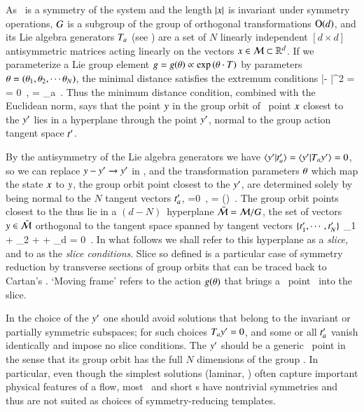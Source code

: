 As \Group\ is a symmetry of the system and the length $|x|$ is
invariant under symmetry operations, $G$ is a subgroup of the group
of orthogonal transformations $\textrm{O}(d)$, and its Lie algebra {generators}
$T_a$ (see ) are a set of $N$ linearly independent
$[d\!\times\!d]$ antisymmetric matrices acting linearly on the {\statesp}
vectors $x \in {\cal M} \subset \mathbb{R}^d$. If we parameterize a Lie group
element $g=g({\bf \theta})\propto\exp{({\ensuremath{{\bf \theta}}} \cdot \ensuremath{T})}$ by
parameters ${\bf \theta} = ({\bf \theta}_1,{\bf \theta}_2,\cdots{\bf \theta}_N)$, the minimal
distance satisfies the extremum conditions
\beq
{} |\ssp - \LieEl\slicep|^2
   =
   = 0
    \,,\qquad
	   = \Lg_a \slicep
\,.
\label{PCsectQ}
\eeq
Thus the minimum distance condition, combined with the Euclidean norm, says
that the point $y$ in the group orbit of \statesp\ point $x$
closest to the {\template} ${y'}$ lies in a hyperplane
through the point ${y'}$, normal to the group action tangent space
$t'_{}$.

By the antisymmetry of the Lie algebra generators we have
$\braket{\slicep}{\sliceTan{a}} = \braket{\slicep}{\Lg_{a}\slicep}=0$, so
we can replace $y - {y'} \to {\ensuremath{y'}}$ in , and
the transformation parameters ${\bf \theta}$ which map the state $x$ to
$y$, the group orbit point
closest to the {\template} ${y'}$, are determined solely by being
normal to the $N$ {\template} tangent vectors $t'_{a}$,
\beq
{} =0
    \,,\qquad
\sspRed = \LieEl(\gSpace) \ssp
\,.
The group orbit points closest to the {\template} thus lie in a
$(d\!-\!N)$\dmn\ hyperplane $\bar{\cal M} = {\cal M}/G$, the set of vectors
$y \in  \bar{\cal M}$ orthogonal to the {\template} tangent space spanned
by tangent vectors $\{t'_{1},\cdots,t'_{N}\}$
\beq
\sspRed_1 + \sspRed_2
  + \cdots + \sspRed_d = 0
\,.
In what follows we shall refer to this hyperplane as a
\emph{slice,} and to   as the \emph{slice conditions}.
Slice so defined is a particular case of symmetry reduction
by transverse sections of group
orbits that can be traced back to
Cartan's \mframes{}. `Moving frame' refers to the action
$g({\bf \theta})$ that
brings a \statesp\ point \ssp\ into the slice.

In the choice of the {\template} ${y'}$ one should avoid solutions
that belong to the invariant or partially symmetric subspaces; for such
choices $T_{a}{y'}=0$, and some or all $t'_{a}$ vanish
identically and impose no slice conditions. The {\template} ${y'}$
should be a generic \statesp\ point in the sense that its group orbit has
the full $N$ dimensions of the group \Group. In particular, even though
the simplest solutions (laminar, \etc) often capture important physical
features of a flow, most \eqva\ and short \po s have nontrivial
symmetries and thus are not suited as choices of symmetry-reducing
templates.

